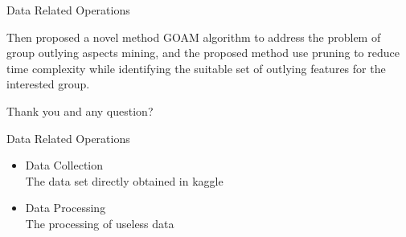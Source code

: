 \documentclass[
 size=14pt,
 paper=smartboard,  %
 mode=present, 		%
 display=slides, 	%
 style=tuliplab,  	%
 pauseslide,
 fleqn,leqno]{powerdot}
\begin{document}
\begin{slide}[toc=,bm=]{ Data Related Operations}
\begin{note}
  Then proposed a novel method GOAM algorithm to address the problem of
  group outlying aspects mining,
  and the proposed method use pruning to reduce time complexity
  while identifying the suitable set of outlying features for the interested group.
  
  Thank you and any question?
  \end{note}
  
  \end{slide}
\begin{slide}[toc=,bm=]{ Data Related Operations}
  \begin{itemize}
  \item Data Collection
  \\The data set directly obtained in kaggle    
  \item 
  Data Processing
  \\The processing of useless data
  

\end{itemize}
\end{slide}
\end{document}
